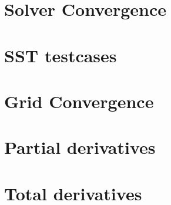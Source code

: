\section{Solver Convergence}

\section{SST testcases}

\section{Grid Convergence}

\section{Partial derivatives}

\section{Total derivatives}
